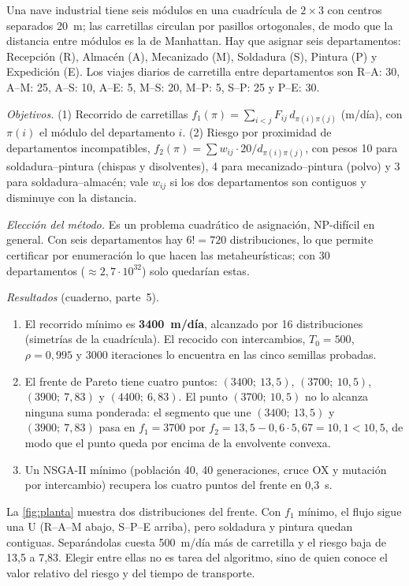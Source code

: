 \begin{ejemplo}\label{ej:planta}
Una nave industrial tiene seis módulos en una cuadrícula de $2\times 3$ con centros separados 20~m; las carretillas circulan por pasillos ortogonales, de modo que la distancia entre módulos es la de Manhattan. Hay que asignar seis departamentos: Recepción (R), Almacén (A), Mecanizado (M), Soldadura (S), Pintura (P) y Expedición (E). Los viajes diarios de carretilla entre departamentos son R--A: 30, A--M: 25, A--S: 10, A--E: 5, M--S: 20, M--P: 5, S--P: 25 y P--E: 30.

\emph{Objetivos.} (1) Recorrido de carretillas $f_1(\pi)=\sum_{i<j}F_{ij}\,d_{\pi(i)\pi(j)}$ (m/día), con $\pi(i)$ el módulo del departamento $i$. (2) Riesgo por proximidad de departamentos incompatibles, $f_2(\pi)=\sum w_{ij}\cdot 20/d_{\pi(i)\pi(j)}$, con pesos 10 para soldadura--pintura (chispas y disolventes), 4 para mecanizado--pintura (polvo) y 3 para soldadura--almacén; vale $w_{ij}$ si los dos departamentos son contiguos y disminuye con la distancia.

\emph{Elección del método.} Es un problema cuadrático de asignación, NP-difícil en general. Con seis departamentos hay $6!=720$ distribuciones, lo que permite certificar por enumeración lo que hacen las metaheurísticas; con 30 departamentos ($\approx 2{,}7\cdot 10^{32}$) solo quedarían estas.

\emph{Resultados} (cuaderno, parte~5).
\begin{enumerate}[label=(\alph*)]
  \item El recorrido mínimo es \textbf{3400~m/día}, alcanzado por 16 distribuciones (simetrías de la cuadrícula). El recocido con intercambios, $T_0=500$, $\rho=0{,}995$ y 3000 iteraciones lo encuentra en las cinco semillas probadas.
  \item El frente de Pareto tiene cuatro puntos: $(3400;\ 13{,}5)$, $(3700;\ 10{,}5)$, $(3900;\ 7{,}83)$ y $(4400;\ 6{,}83)$. El punto $(3700;\ 10{,}5)$ no lo alcanza ninguna suma ponderada: el segmento que une $(3400;\ 13{,}5)$ y $(3900;\ 7{,}83)$ pasa en $f_1=3700$ por $f_2=13{,}5-0{,}6\cdot 5{,}67=10{,}1<10{,}5$, de modo que el punto queda por encima de la envolvente convexa.
  \item Un NSGA-II mínimo (población 40, 40 generaciones, cruce OX y mutación por intercambio) recupera los cuatro puntos del frente en 0,3~s.
\end{enumerate}
La \cref{fig:planta} muestra dos distribuciones del frente. Con $f_1$ mínimo, el flujo sigue una U (R--A--M abajo, S--P--E arriba), pero soldadura y pintura quedan contiguas. Separándolas cuesta 500~m/día más de carretilla y el riesgo baja de 13,5 a 7,83. Elegir entre ellas no es tarea del algoritmo, sino de quien conoce el valor relativo del riesgo y del tiempo de transporte.
\end{ejemplo}

